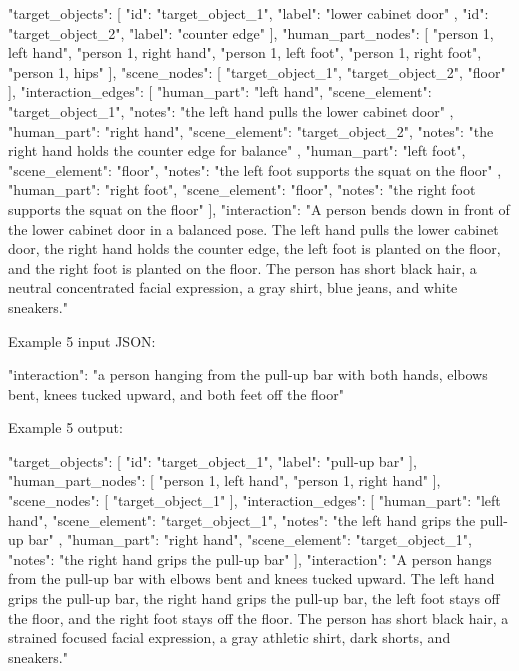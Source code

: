 \begin{promptblock}
{
  "target_objects": [
    {
      "id": "target_object_1",
      "label": "lower cabinet door"
    },
    {
      "id": "target_object_2",
      "label": "counter edge"
    }
  ],
  "human_part_nodes": [
    "person 1, left hand",
    "person 1, right hand",
    "person 1, left foot",
    "person 1, right foot",
    "person 1, hips"
  ],
  "scene_nodes": [
    "target_object_1",
    "target_object_2",
    "floor"
  ],
  "interaction_edges": [
    {
      "human_part": "left hand",
      "scene_element": "target_object_1",
      "notes": "the left hand pulls the lower cabinet door"
    },
    {
      "human_part": "right hand",
      "scene_element": "target_object_2",
      "notes": "the right hand holds the counter edge for balance"
    },
    {
      "human_part": "left foot",
      "scene_element": "floor",
      "notes": "the left foot supports the squat on the floor"
    },
    {
      "human_part": "right foot",
      "scene_element": "floor",
      "notes": "the right foot supports the squat on the floor"
    }
  ],
  "interaction": "A person bends down in front of the lower cabinet door in a balanced pose. The left hand pulls the lower cabinet door, the right hand holds the counter edge, the left foot is planted on the floor, and the right foot is planted on the floor. The person has short black hair, a neutral concentrated facial expression, a gray shirt, blue jeans, and white sneakers."
}

Example 5 input JSON:

{
  "interaction": "a person hanging from the pull-up bar with both hands, elbows bent, knees tucked upward, and both feet off the floor"
}

Example 5 output:

{
  "target_objects": [
    {
      "id": "target_object_1",
      "label": "pull-up bar"
    }
  ],
  "human_part_nodes": [
    "person 1, left hand",
    "person 1, right hand"
  ],
  "scene_nodes": [
    "target_object_1"
  ],
  "interaction_edges": [
    {
      "human_part": "left hand",
      "scene_element": "target_object_1",
      "notes": "the left hand grips the pull-up bar"
    },
    {
      "human_part": "right hand",
      "scene_element": "target_object_1",
      "notes": "the right hand grips the pull-up bar"
    }
  ],
  "interaction": "A person hangs from the pull-up bar with elbows bent and knees tucked upward. The left hand grips the pull-up bar, the right hand grips the pull-up bar, the left foot stays off the floor, and the right foot stays off the floor. The person has short black hair, a strained focused facial expression, a gray athletic shirt, dark shorts, and sneakers."
}
\end{promptblock}

